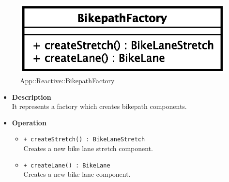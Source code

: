 \begin{figure}[h]
\centering
\includegraphics[scale=0.6,keepaspectratio]{images/solution/bikepath_factory.eps}
\caption{App::Reactive::BikepathFactory}
\label{fig:sd-app-bikepath-factory}
\end{figure}
\FloatBarrier
\begin{itemize}
  \item \textbf{Description} \\
It represents a factory which creates bikepath components.
  \item \textbf{Operation} \\
  \begin{itemize} 
    \item \texttt{+ createStretch() : BikeLaneStretch} \\
Creates a new bike lane stretch component.
    \item \texttt{+ createLane() : BikeLane} \\
Creates a new bike lane component.
  \end{itemize}
\end{itemize}
